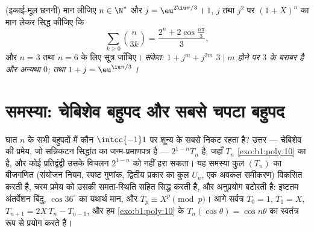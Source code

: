 \begin{exercise}[$\star\star$]\label{exo:b1:poly:12}
(इकाई-मूल छननी) मान लीजिए $n \in \N^*$ और $j = \eu^{2\iu\pi/3}$। $1$, $j$
तथा $j^2$ पर $(1 + X)^n$ का मान लेकर सिद्ध कीजिए कि
\[
\sum_{k \geq 0} \binom{n}{3k}
= \frac{2^n + 2\cos\frac{n\pi}{3}}{3} ,
\]
और $n = 3$ तथा $n = 6$ के लिए सूत्र जाँचिए। \emph{संकेत: $1 + j^m + j^{2m}$
$3 \mid m$ होने पर $3$ के बराबर है और अन्यथा $0$; तथा $1 + j =
\eu^{\iu\pi/3}$।}
\end{exercise}

\section{समस्या: चेबिशेव बहुपद और सबसे चपटा बहुपद}

\begin{problem}\label{pb:b1:poly:1}
घात $n$ के सभी \emph{} बहुपदों में कौन $\intcc{-1}1$ पर शून्य के
सबसे निकट रहता है? उत्तर --- चेबिशेव की प्रमेय, जो सन्निकटन सिद्धांत का
जन्म-प्रमाणपत्र है --- $2^{1-n}T_n$ है, जहाँ $T_n$ \cref{exo:b1:poly:10} का
 है, और कोई  प्रतिद्वंद्वी उसके विचलन $2^{1-n}$ को
नहीं हरा सकता। यह समस्या कुल $(T_n)$ का बीजगणित (संयोजन
नियम, स्पष्ट गुणांक, द्वितीय प्रकार का कुल $U_n$, एक अवकल समीकरण) विकसित
करती है, चरम प्रमेय को उसकी समता-स्थिति सहित सिद्ध करती है, और अनुप्रयोग
बटोरती है: इष्टतम अंतर्वेशन बिंदु, $\cos 36^\circ$ का यथार्थ मान, और
 $T_p \equiv X^p \pmod p$। आगे सर्वत्र $T_0 = 1$, $T_1 = X$,
$T_{n+1} = 2X\,T_n - T_{n-1}$, और हम \cref{exo:b1:poly:10} के
$T_n(\cos\theta) = \cos n\theta$ का स्वतंत्र रूप से प्रयोग करते हैं।


\end{problem}
